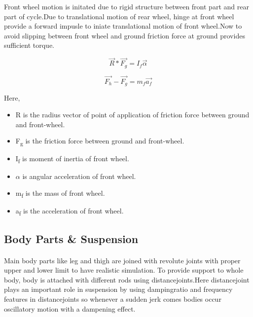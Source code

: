 \documentclass[11pt]{article}
\begin{document}
	Front wheel motion is initated due to rigid structure between front part and rear part of cycle.Due to translational motion of rear
	wheel, hinge at front wheel provide a forward impusle to iniate translational motion of front wheel.Now to avoid slipping between 
	front wheel and ground friction force at ground provides sufficient torque.   

\begin{equation}
		\vec{R} * \vec{F_g}= I_f \vec\alpha
\end{equation}

\begin{equation}
		\vec{F_h} - \vec{F_g} = m_f \vec{a_f}
\end{equation}

Here, 	
\begin{itemize}
\item R is the radius vector of point of application of friction force between ground and front-wheel.
\item F\textsubscript{g} is the friction force between ground and front-wheel.
\item I\textsubscript{f} is moment of inertia of front wheel.
\item $\alpha$ is angular acceleration of front wheel.
\item m\textsubscript{f} is the mass of front wheel.
\item a\textsubscript{f} is the acceleration of front wheel.
\end{itemize}

\subsection{Body Parts \& Suspension}
\paragraph{}

	Main body parts like leg and thigh are joined with revolute joints with proper upper and lower limit to have realistic simulation.
	To provide support to whole body, body is attached with different rods using distancejoints.Here distancejoint plays an important 
	role in suspension by using dampingratio and frequency features in distancejoints so whenever a sudden jerk comes bodies occur 
	oscillatory motion with a dampening effect.    
	
\end{document}
